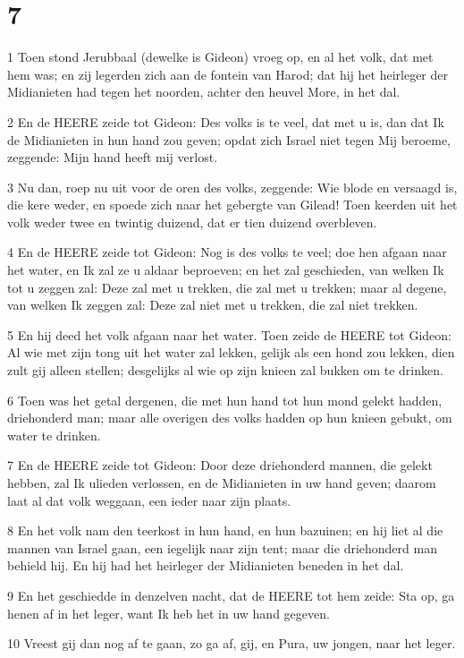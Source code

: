 \chapter{7}

\par 1 Toen stond Jerubbaal (dewelke is Gideon) vroeg op, en al het volk, dat met hem was; en zij legerden zich aan de fontein van Harod; dat hij het heirleger der Midianieten had tegen het noorden, achter den heuvel More, in het dal.
\par 2 En de HEERE zeide tot Gideon: Des volks is te veel, dat met u is, dan dat Ik de Midianieten in hun hand zou geven; opdat zich Israel niet tegen Mij beroeme, zeggende: Mijn hand heeft mij verlost.
\par 3 Nu dan, roep nu uit voor de oren des volks, zeggende: Wie blode en versaagd is, die kere weder, en spoede zich naar het gebergte van Gilead! Toen keerden uit het volk weder twee en twintig duizend, dat er tien duizend overbleven.
\par 4 En de HEERE zeide tot Gideon: Nog is des volks te veel; doe hen afgaan naar het water, en Ik zal ze u aldaar beproeven; en het zal geschieden, van welken Ik tot u zeggen zal: Deze zal met u trekken, die zal met u trekken; maar al degene, van welken Ik zeggen zal: Deze zal niet met u trekken, die zal niet trekken.
\par 5 En hij deed het volk afgaan naar het water. Toen zeide de HEERE tot Gideon: Al wie met zijn tong uit het water zal lekken, gelijk als een hond zou lekken, dien zult gij alleen stellen; desgelijks al wie op zijn knieen zal bukken om te drinken.
\par 6 Toen was het getal dergenen, die met hun hand tot hun mond gelekt hadden, driehonderd man; maar alle overigen des volks hadden op hun knieen gebukt, om water te drinken.
\par 7 En de HEERE zeide tot Gideon: Door deze driehonderd mannen, die gelekt hebben, zal Ik ulieden verlossen, en de Midianieten in uw hand geven; daarom laat al dat volk weggaan, een ieder naar zijn plaats.
\par 8 En het volk nam den teerkost in hun hand, en hun bazuinen; en hij liet al die mannen van Israel gaan, een iegelijk naar zijn tent; maar die driehonderd man behield hij. En hij had het heirleger der Midianieten beneden in het dal.
\par 9 En het geschiedde in denzelven nacht, dat de HEERE tot hem zeide: Sta op, ga henen af in het leger, want Ik heb het in uw hand gegeven.
\par 10 Vreest gij dan nog af te gaan, zo ga af, gij, en Pura, uw jongen, naar het leger.
